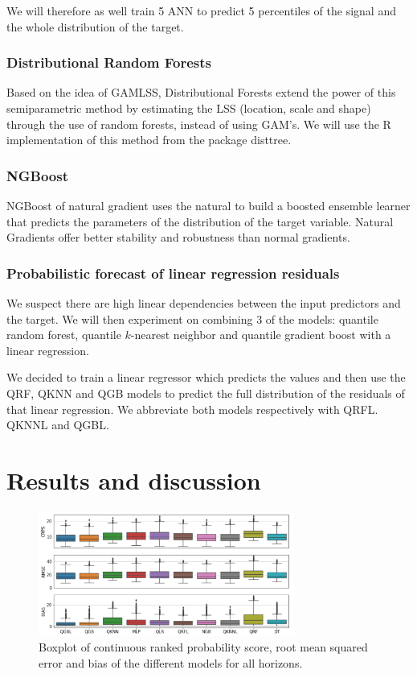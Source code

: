 \documentclass[a4paper,3p,sort&compress]{elsarticle}
\begin{document}
We will therefore as well train 5 ANN to predict 5 percentiles of the \no signal
and the whole distribution of the target.

\subsubsection{Distributional Random Forests}

Based on the idea of GAMLSS, Distributional Forests 
\cite{schlosser_distributional_2019} extend the power 
of this semiparametric method by estimating the LSS 
(location, scale and shape) through the use of random forests, 
instead of using GAM's. We will use the R implementation of this 
method from the package disttree.

\subsubsection{NGBoost}

NGBoost of natural gradient \cite{duan_ngboost_2019} uses the natural to 
build a boosted ensemble 
learner that predicts the parameters of the distribution of the target variable.
Natural Gradients offer better stability and robustness than normal gradients.


\subsubsection{Probabilistic forecast of linear regression residuals}

We suspect there are high linear dependencies between the
input predictors and the target. We will then experiment 
on combining 3 of the models: quantile random forest, quantile
$k$-nearest neighbor and quantile gradient boost with a linear regression.

We decided to train a linear regressor which predicts the
\no values and then use the QRF, QKNN and QGB models 
to predict the full distribution of the residuals
of that linear regression. We abbreviate both models respectively with
QRFL. QKNNL and QGBL.

\section{Results and discussion}
\label{sec:results}

\begin{figure}[tbp]
  \centering
  \includegraphics[width=0.75\textwidth]{error_graph}
  \caption{\label{figure:errorGraph}
    Boxplot of continuous ranked probability score, root mean squared
    error and bias of the different models for all horizons.
  }
\end{figure}
\end{document}
